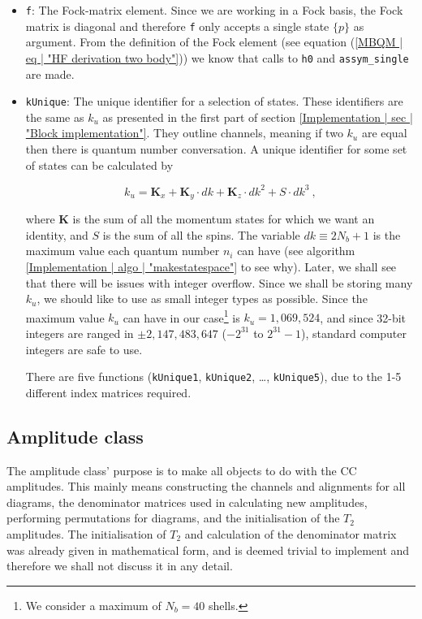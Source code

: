 \documentclass[10pt,twoside]{report}
\begin{document}
\begin{itemize}
		\item \texttt{f}: The Fock-matrix element. Since we are working in a Fock basis, the Fock matrix is diagonal and therefore \texttt{f} only accepts a single state $\{p\}$ as argument. From the definition of the Fock element (see equation (\ref{MBQM | eq | "HF derivation two body"})) we know that calls to \texttt{h0} and \texttt{assym\_single} are made.
		
		\item \texttt{kUnique}: The unique identifier for a selection of states. These identifiers are the same as $k_u$ as presented in the first part of section \ref{Implementation | sec | "Block implementation"}. They outline channels, meaning if two $k_u$ are equal then there is quantum number conversation. A unique identifier for some set of states can be calculated by
		
		\begin{equation}
			k_u = \bm{K}_x + \bm{K}_y\cdot dk + \bm{K}_z\cdot dk^2 + S\cdot dk^3 \:,
		\end{equation}
		
		where $\bm{K}$ is the sum of all the momentum states for which we want an identity, and $S$ is the sum of all the spins. The variable $dk\equiv 2N_b+1$ is the maximum value each quantum number $n_i$ can have (see algorithm \ref{Implementation | algo | "makestatespace"} to see why). Later, we shall see that there will be issues with integer overflow. Since we shall be storing many $k_u$, we should like to use as small integer types as possible. Since the maximum value $k_u$ can have in our case\footnote{We consider a maximum of $N_b=40$ shells.} is $k_u=1,069,524$, and since 32-bit integers are ranged in $\pm2,147,483,647$ ($-2^{31}$ to $2^{31}-1$), standard computer integers are safe to use.
		
		There are five functions (\texttt{kUnique1}, \texttt{kUnique2}, \ldots, \texttt{kUnique5}), due to the 1-5 different index matrices required. 
	\end{itemize}
	
	\subsection{Amplitude class}
	The amplitude class' purpose is to make all objects to do with the CC amplitudes. This mainly means constructing the channels and alignments for all diagrams, the denominator matrices used in calculating new amplitudes, performing permutations for diagrams, and the initialisation of the $T_2$ amplitudes. The initialisation of $T_2$ and calculation of the denominator matrix was already given in mathematical form, and is deemed trivial to implement and therefore we shall not discuss it in any detail.\\
	
\end{document}
